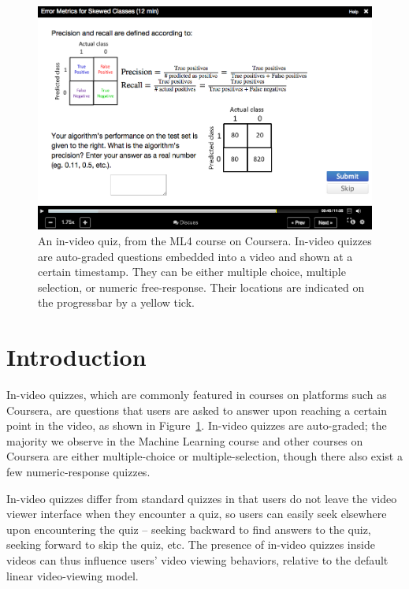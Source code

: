 \documentclass{sigchi}
\begin{document}

\begin{figure}
\includegraphics[width=1.0\columnwidth]{coursera}
\caption{An in-video quiz, from the ML4 course on Coursera. In-video quizzes are auto-graded questions embedded into a video and shown at a certain timestamp. They can be either multiple choice, multiple selection, or numeric free-response. Their locations are indicated on the progressbar by a yellow tick.}
\label{fig:coursera}
\end{figure}

\section{Introduction}

In-video quizzes, which are commonly featured in courses on platforms such as Coursera, are questions that users are asked to answer upon reaching a certain point in the video, as shown in Figure~\ref{fig:coursera}. In-video quizzes are auto-graded; the majority we observe in the Machine Learning course and other courses on Coursera are either multiple-choice or multiple-selection, though there also exist a few numeric-response quizzes.

In-video quizzes differ from standard quizzes in that users do not leave the video viewer interface when they encounter a quiz, so users can easily seek elsewhere upon encountering the quiz -- seeking backward to find answers to the quiz, seeking forward to skip the quiz, etc.
The presence of in-video quizzes inside videos can thus influence users' video viewing behaviors,
relative to the default linear video-viewing model.
\end{document}
